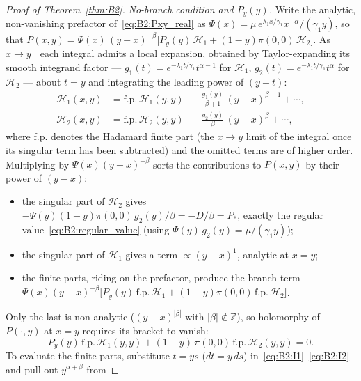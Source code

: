 \begin{proof}[Proof of Theorem~\ref{thm:B2}]
\smallskip\noindent\textit{No-branch condition and $P_y(y)$.}
Write the analytic, non-vanishing prefactor of~\eqref{eq:B2:Pxy_real} as
$\Psi(x)=\mu\,e^{\lambda_1 x/\gamma_1}x^{-\alpha}/(\gamma_1 y)$, so that
$P(x,y)=\Psi(x)\,(y-x)^{-\beta}\bigl[P_y(y)\,\mathcal{H}_1+(1-y)\pi(0,0)\,\mathcal{H}_2\bigr]$.
As $x\to y^{-}$ each integral admits a local expansion, obtained by Taylor-expanding its
smooth integrand factor --- $g_1(t)=e^{-\lambda_1 t/\gamma_1}t^{\alpha-1}$ for
$\mathcal{H}_1$, $g_2(t)=e^{-\lambda_1 t/\gamma_1}t^{\alpha}$ for $\mathcal{H}_2$ --- about
$t=y$ and integrating the leading power of $(y-t)$:
\begin{align}
    \mathcal{H}_1(x,y) &= \mathrm{f.p.}\,\mathcal{H}_1(y,y)
        \;-\; \frac{g_1(y)}{\beta+1}\,(y-x)^{\beta+1} + \cdots,
    \label{eq:B2:I1_expansion}\\
    \mathcal{H}_2(x,y) &= \mathrm{f.p.}\,\mathcal{H}_2(y,y)
        \;-\; \frac{g_2(y)}{\beta}\,(y-x)^{\beta} + \cdots,
    \label{eq:B2:I2_expansion}
\end{align}
where $\mathrm{f.p.}$ denotes the Hadamard finite part (the $x\to y$ limit of the integral
once its singular term has been subtracted) and the omitted terms are of higher order.
Multiplying by $\Psi(x)(y-x)^{-\beta}$ sorts the contributions to $P(x,y)$ by their power of
$(y-x)$:
\begin{itemize}
    \item the singular part of $\mathcal{H}_2$ gives
    $-\Psi(y)(1-y)\pi(0,0)\,g_2(y)/\beta=-D/\beta=P_*$, exactly the regular
    value~\eqref{eq:B2:regular_value} (using $\Psi(y)\,g_2(y)=\mu/(\gamma_1 y)$);
    \item the singular part of $\mathcal{H}_1$ gives a term $\propto(y-x)^{1}$, analytic at $x=y$;
    \item the finite parts, riding on the prefactor, produce the branch term
    $\Psi(x)(y-x)^{-\beta}\bigl[P_y(y)\,\mathrm{f.p.}\,\mathcal{H}_1+(1-y)\pi(0,0)\,\mathrm{f.p.}\,\mathcal{H}_2\bigr]$.
\end{itemize}
Only the last is non-analytic ($(y-x)^{|\beta|}$ with $|\beta|\notin\mathbb{Z}$), so
holomorphy of $P(\cdot,y)$ at $x=y$ requires its bracket to vanish:
\begin{equation}
    P_y(y)\,\mathrm{f.p.}\,\mathcal{H}_1(y,y)
    + (1-y)\,\pi(0,0)\,\mathrm{f.p.}\,\mathcal{H}_2(y,y) = 0.
    \label{eq:B2:nobranch}
\end{equation}
To evaluate the finite parts, substitute $t=ys$ ($dt=y\,ds$)
in~\eqref{eq:B2:I1}--\eqref{eq:B2:I2} and pull out $y^{\alpha+\beta}$ from

\end{proof}
